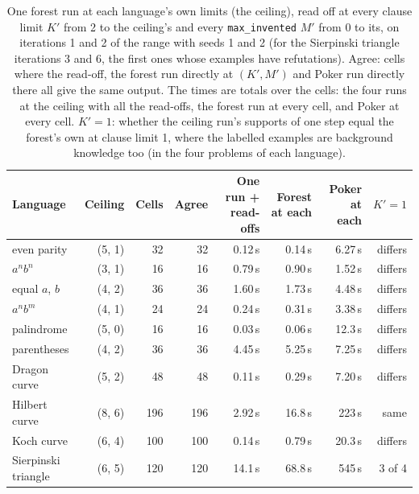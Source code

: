 \documentclass[11pt]{article}
\begin{document}
\begin{table}[ht]
\centering
\footnotesize
\begin{tabular}{lrrrrrrr}
\toprule
Language & Ceiling & Cells & Agree & One run + read-offs & Forest at each & Poker at each & $K' = 1$\\
\midrule
even parity    & (5, 1) & 32  & 32  & 0.12\,s & 0.14\,s & 6.27\,s  & differs\\
$a^nb^n$       & (3, 1) & 16  & 16  & 0.79\,s & 0.90\,s & 1.52\,s  & differs\\
equal $a$, $b$ & (4, 2) & 36  & 36  & 1.60\,s & 1.73\,s & 4.48\,s  & differs\\
$a^nb^m$       & (4, 1) & 24  & 24  & 0.24\,s & 0.31\,s & 3.38\,s  & differs\\
palindrome     & (5, 0) & 16  & 16  & 0.03\,s & 0.06\,s & 12.3\,s  & differs\\
parentheses    & (4, 2) & 36  & 36  & 4.45\,s & 5.25\,s & 7.25\,s  & differs\\
Dragon curve   & (5, 2) & 48  & 48  & 0.11\,s & 0.29\,s & 7.20\,s  & differs\\
Hilbert curve  & (8, 6) & 196 & 196 & 2.92\,s & 16.8\,s & 223\,s   & same\\
Koch curve     & (6, 4) & 100 & 100 & 0.14\,s & 0.79\,s & 20.3\,s  & differs\\
Sierpinski triangle & (6, 5) & 120 & 120 & 14.1\,s & 68.8\,s & 545\,s & 3 of 4\\
\bottomrule
\end{tabular}
\caption{One forest run at each language's own limits (the ceiling), read off at
every clause limit $K'$ from 2 to the ceiling's and every \texttt{max\_invented}
$M'$ from 0 to its, on iterations 1 and 2 of the range with seeds 1 and 2 (for the
Sierpinski triangle iterations 3 and 6, the first ones whose examples have
refutations). Agree:
cells where the read-off, the forest run directly at $(K', M')$ and Poker run
directly there all give the same output. The times are totals over the cells: the
four runs at the ceiling with all the read-offs, the forest run at every cell, and
Poker at every cell. $K' = 1$: whether the ceiling run's supports of one step equal
the forest's own at clause limit 1, where the labelled examples are background
knowledge too (in the four problems of each language).}
\label{tab:readoff}
\end{table}
\end{document}
